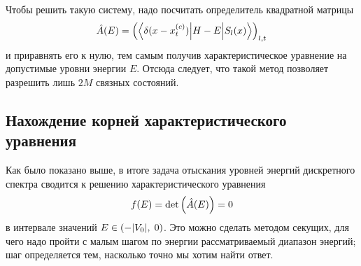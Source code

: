 \documentclass[10pt]{article}
\begin{document}
Чтобы решить такую систему, надо посчитать определитель квадратной матрицы
\begin{equation}
    \hat A(E) = \qty(\mel**{\delta(x-x^{(c)}_t)}{H-E}{S_{l}(x)})_{l,t}
\end{equation}
и приравнять его к нулю, тем самым получив характеристическое уравнение на допустимые уровни энергии $E$. Отсюда следует, что такой метод позволяет разрешить лишь $2M$ связных состояний.

\subsection{Нахождение корней характеристического уравнения}

Как было показано выше, в итоге задача отыскания уровней энергий дискретного спектра сводится к решению характеристического уравнения
\begin{equation}
    f(E) = \det\qty(\hat A(E)) = 0
\end{equation}
в интервале значений $E \in \qty(-\abs{V_0},\; 0)$. Это можно сделать методом секущих, для чего надо пройти с малым шагом по энергии рассматриваемый диапазон энергий; шаг определяется тем, насколько точно мы хотим найти ответ.
\end{document}
